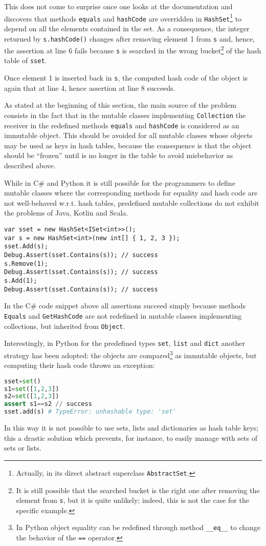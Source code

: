 This does not come to surprise once one looks at the documentation and discovers that methods \lstinline{equals} and \lstinline{hashCode} are overridden in \lstinline{HashSet}\footnote{Actually, in its direct abstract superclass \lstinline{AbstractSet}.} to depend on all the elements contained in the set. As a consequence, the integer returned by  \lstinline{s.hashCode()} changes after removing element 1 from \lstinline{s} and, hence, the assertion at line 6 fails because \lstinline{s} is searched in the wrong bucket\footnote{It is still possible that the searched bucket is the right one after removing the element from \lstinline{s}, but it is quite unlikely; indeed, this is not the case for the specific example.} of the hash table of \lstinline{sset}.

Once element 1 is inserted back in \lstinline{s}, the computed hash code of the object is again that at line 4, hence assertion at line 8 succeeds. 

As stated at the beginning of this section, the main source of the problem consists in the fact that in the mutable classes implementing \lstinline{Collection} the receiver in the redefined methods \lstinline{equals} and \lstinline{hashCode} is considered as an immutable object. This should be avoided for all mutable classes whose objects may be used as keys in hash tables, because the consequence is that the object should be ``frozen'' until is no longer in the table to avoid misbehavior as described above.

While in C\# and Python it is still possible for the programmers to define mutable classes where the corresponding methods for
equality and hash code are not well-behaved w.r.t. hash tables, predefined mutable collections do not exhibit the problems of Java, Kotlin and Scala.
\begin{lstlisting}
var sset = new HashSet<ISet<int>>();
var s = new HashSet<int>(new int[] { 1, 2, 3 });
sset.Add(s);
Debug.Assert(sset.Contains(s)); // success
s.Remove(1);
Debug.Assert(sset.Contains(s)); // success 
s.Add(1);
Debug.Assert(sset.Contains(s)); // success
\end{lstlisting}
In the C\# code snippet above all assertions succeed simply because methods \lstinline{Equals} and \lstinline{GetHashCode} are not redefined
in mutable classes implementing collections, but inherited from \lstinline{Object}.

Interestingly, in Python for the predefined types \lstinline{set}, \lstinline{list} and \lstinline{dict} another strategy has been adopted: the objects are compared\footnote{In Python object equality can be redefined through method \lstinline{__eq__} to change the behavior of the \lstinline{==} operator.} as
immutable objects, but computing their hash code throws an exception:
\begin{lstlisting}[language=Python]
sset=set()                                                           
s1=set([1,2,3])
s2=set([1,2,3])
assert s1==s2 // success
sset.add(s) # TypeError: unhashable type: 'set'       
\end{lstlisting}
In this way it is not possible to use sets, lists and dictionaries as hash table keys; this a drastic solution which prevents, for instance, to easily manage with sets of sets or lists. 

